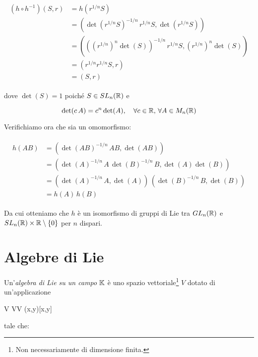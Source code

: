 \begin{align}
	\begin{split}
		(h \circ h^{-1})(S,r) &= h \left( r^{1/n} S \right) \\
		&= \left( \det(r^{1/n} S)^{-1/n} \, r^{1/n} S, \det(r^{1/n} S) \right) \\
		&= \left( \left( (r^{1/n})^{n} \det(S) \right)^{-1/n} \, r^{1/n} S, (r^{1/n})^{n} \det(S) \right) \\
		&= \left( r^{1/n} r^{1/n} S, r \right) \\
		&= (S,r)
	\end{split}
\end{align}

dove $ \det(S) = 1 $ poiché $ S \in SL_{n} (\mathbb{R}) $ e

\begin{equation}
	\det(c \, A) = c^{n} \det(A) \qcomma \forall c \in \R, \, \forall A \in M_{n}(\R)
\end{equation}

Verifichiamo ora che sia un omomorfismo:

\begin{align}
	\begin{split}
		h(A B) &= \left( \det(A B)^{-1/n} \, A B, \det(A B) \right) \\
		&= \left( \det(A)^{-1/n} \, A \, \det(B)^{-1/n} \, B, \det(A) \det(B) \right) \\
		&= \left( \det(A)^{-1/n} \, A, \det(A) \right) \, \left( \det(B)^{-1/n} \, B, \det(B) \right) \\
		&= h(A) \, h(B)
	\end{split}
\end{align}

Da cui otteniamo che $ h $ è un isomorfismo di gruppi di Lie tra $ GL_{n}(\mathbb{R}) $ e $ SL_{n}(\mathbb{R}) \times \mathbb{R} \setminus \{0\} $ per $ n $ dispari.

\section{Algebre di Lie}

Un'\textit{algebra di Lie su un campo} $ \mathbb{K} $ è uno spazio vettoriale\footnote{%
	Non necessariamente di dimensione finita.%
} $ V $ dotato di un'applicazione

\map{[,]}%
	{V \times V}{V}%
	{(x,y)}{[x,y]}

tale che:

